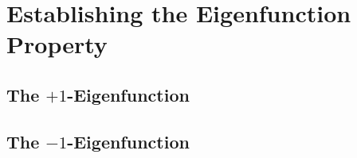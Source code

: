 \section{Establishing the Eigenfunction Property}


\subsection{The $+1$-Eigenfunction}

\subsection{The $-1$-Eigenfunction}